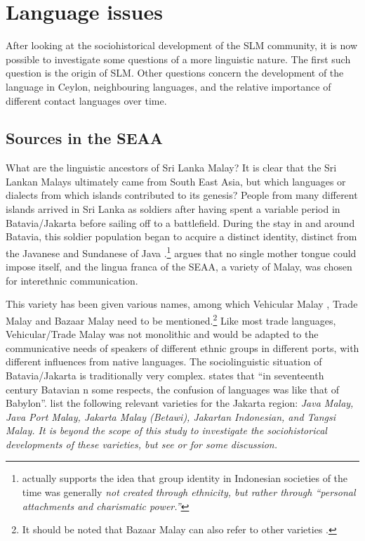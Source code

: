 \section{Language issues}\label{sec:slmbg:LanguageIssues}
After looking at the sociohistorical development of the SLM community, it is now possible to investigate some questions of a more linguistic nature. The first such question is the origin of SLM. Other questions concern the development of the language in Ceylon, neighbouring languages, and the relative importance of different contact languages over time.

\subsection{Sources in the SEAA}\label{sec:slmbg:SourcesintheSEAA}
What are the linguistic ancestors of Sri Lanka Malay? It is clear that the Sri Lankan Malays ultimately came from South East Asia, but which languages or dialects from which islands contributed to its genesis? People from many different islands arrived in Sri Lanka as soldiers after having spent a variable period in Batavia/Jakarta before  sailing off to a battlefield. During the stay in and around Batavia, this soldier population began to acquire a distinct identity, distinct from the Javanese and Sundanese  of Java \citep[174]{Vlekke1943}.\footnote{\citet[99]{Raben2000} actually supports the idea that group identity in Indonesian societies of the time  was generally \em not \em created through ethnicity, but rather through ``personal attachments and charismatic power.''} \citet[14]{SmithRH} argues that  no single mother tongue could impose itself, and the lingua franca of the SEAA, a variety of Malay, was chosen for interethnic communication. %

This variety has been given various names, among which Vehicular Malay \citep{SmithRH}, Trade Malay \citep{Ansaldo2005ms} and Bazaar Malay need to be mentioned.\footnote{It should be noted that Bazaar Malay can also refer to other varieties \citep{Paauw2003}.} Like most trade languages, Vehicular/Trade Malay was not monolithic and would be adapted to the communicative needs of speakers of different ethnic groups in different ports, with different influences from native languages. The sociolinguistic situation of Batavia/Jakarta is traditionally very complex. \citet[132]{Vlekke1943} states that ``in seventeenth century Batavian \el [i]n some respects, the confusion of languages was like that of Babylon''.
 \citet{AdelaarEtAl1996} list the following relevant varieties for the Jakarta region: \em Java Malay, Java Port Malay, Jakarta Malay (Betawi), Jakartan Indonesian, \em and \em  Tangsi Malay\em. It is beyond the scope of this study to investigate the sociohistorical developments of these varieties, but see \citet{Grijns1991} or \citet{Paauw2004,Paauw2008phd} for some discussion.

